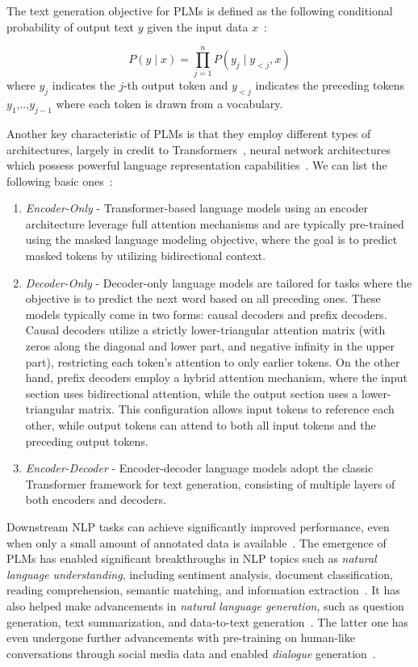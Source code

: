 \documentclass{DESSThesis}
\begin{document}
The text generation objective for PLMs is defined as the following conditional probability of output text $y$ given the input data $x$~\cite{10.1145/3649449}:

\begin{equation}
    P(y \mid x) = \prod_{j=1}^{n}P(y_j \mid y_{<j}, x)
\end{equation}
where $y_j$ indicates the $j$-th output token and $y_{<j}$ indicates the preceding tokens $y_1$,..,$y_{j-1}$ where each token is drawn from a vocabulary.

Another key characteristic of PLMs is that they employ different types of architectures, largely in credit to Transformers~\cite{vaswani2017attention}, neural network architectures which possess powerful language representation capabilities~\cite{10.1145/3490443}. We can list the following basic ones~\cite{10.1145/3649449}:

\begin{enumerate}
    \item \emph{Encoder-Only} - Transformer-based language models using an encoder architecture leverage full attention mechanisms and are typically pre-trained using the masked language modeling objective, where the goal is to predict masked tokens by utilizing bidirectional context.
    
    \item \emph{Decoder-Only} - Decoder-only language models are tailored for tasks where the objective is to predict the next word based on all preceding ones. These models typically come in two forms: causal decoders and prefix decoders. Causal decoders utilize a strictly lower-triangular attention matrix (with zeros along the diagonal and lower part, and negative infinity in the upper part), restricting each token's attention to only earlier tokens. On the other hand, prefix decoders employ a hybrid attention mechanism, where the input section uses bidirectional attention, while the output section uses a lower-triangular matrix. This configuration allows input tokens to reference each other, while output tokens can attend to both all input tokens and the preceding output tokens.

    \item \emph{Encoder-Decoder} - Encoder-decoder language models adopt the classic Transformer framework for text generation, consisting of multiple layers of both encoders and decoders.
\end{enumerate}

Downstream NLP tasks can achieve significantly improved performance, even when only a small amount of annotated data is available~\cite{WANG202351}. The emergence of PLMs has enabled significant breakthroughs in NLP topics such as \emph{natural language understanding}, including sentiment analysis, document classification, reading comprehension, semantic matching, and information extraction~\cite{WANG202351}. It has also helped make advancements in \emph{natural language generation}, such as question generation, text summarization, and data-to-text generation~\cite{WANG202351}. The latter one has even undergone further advancements with pre-training on human-like conversations through social media data and enabled \emph{dialogue} generation~\cite{WANG202351}.
\end{document}
